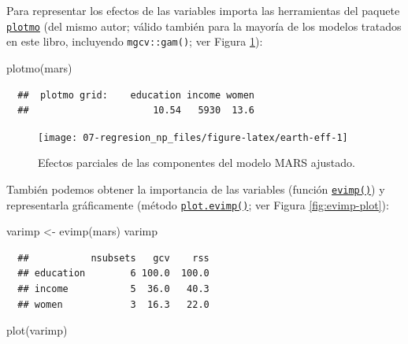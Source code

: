 \documentclass[
]{book}
\newenvironment{Shaded}{\begin{snugshade}}{\end{snugshade}}
\newcommand{\FunctionTok}[1]{\textcolor[rgb]{0.00,0.00,0.00}{#1}}
\newcommand{\NormalTok}[1]{#1}
\newcommand{\OtherTok}[1]{\textcolor[rgb]{0.56,0.35,0.01}{#1}}
\theoremstyle{break}
\theoremstyle{nonumberplain}
\begin{document}
Para representar los efectos de las variables importa las herramientas del paquete \href{https://CRAN.R-project.org/package=plotmo}{\texttt{plotmo}} (del mismo autor; válido también para la mayoría de los modelos tratados en este libro, incluyendo \texttt{mgcv::gam()}; ver Figura \ref{fig:earth-eff}):



\begin{Shaded}
\begin{Highlighting}[]
\FunctionTok{plotmo}\NormalTok{(mars)}
\end{Highlighting}
\end{Shaded}

\begin{verbatim}
  ##  plotmo grid:    education income women
  ##                      10.54   5930  13.6
\end{verbatim}

\begin{figure}[!htb]

{\centering \texttt{[image: 07-regresion\_np\_files/figure-latex/earth-eff-1]} 

}

\caption{Efectos parciales de las componentes del modelo MARS ajustado.}\label{fig:earth-eff}
\end{figure}

También podemos obtener la importancia de las variables (función \href{https://rdrr.io/pkg/earth/man/evimp.html}{\texttt{evimp()}}) y representarla gráficamente (método \href{https://rdrr.io/pkg/earth/man/plot.evimp.html}{\texttt{plot.evimp()}}; ver Figura \ref{fig:evimp-plot}):

\begin{Shaded}
\begin{Highlighting}[]
\NormalTok{varimp }\OtherTok{\textless{}{-}} \FunctionTok{evimp}\NormalTok{(mars)}
\NormalTok{varimp}
\end{Highlighting}
\end{Shaded}

\begin{verbatim}
  ##           nsubsets   gcv    rss
  ## education        6 100.0  100.0
  ## income           5  36.0   40.3
  ## women            3  16.3   22.0
\end{verbatim}

\begin{Shaded}
\begin{Highlighting}[]
\FunctionTok{plot}\NormalTok{(varimp)}
\end{Highlighting}
\end{Shaded}
\end{document}
